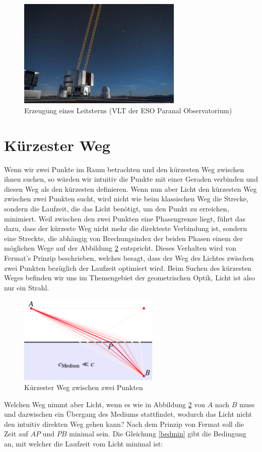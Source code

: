 \begin{refsection}
\begin{figure}
  \centering
  \includegraphics[width=0.7\textwidth]{adaptiv/images/Leitstern}
  \caption{Erzeugung eines Leitsterns (VLT der ESO Paranal Observatorium)
    \cite{eso:leitstern}}
  \label{fig:leitstern}
\end{figure}

\section{Kürzester Weg}
Wenn wir zwei Punkte im Raum betrachten und den kürzesten Weg zwischen ihnen suchen, so würden wir intuitiv die Punkte mit einer Geraden verbinden und diesen Weg als den kürzesten definieren. Wenn nun aber Licht den kürzesten Weg zwischen zwei Punkten sucht, wird nicht wie beim klassischen Weg die Strecke, sondern die Laufzeit, die das Licht benötigt, um den Punkt zu erreichen, minimiert. Weil zwischen den zwei Punkten eine Phasengrenze liegt, führt das dazu, dass der kürzeste Weg nicht mehr die direkteste Verbindung ist, sondern eine Streckte, die abhängig von Brechungsindex der beiden Phasen einem der möglichen Wege auf der Abbildung \ref{fig:weg} entspricht. Dieses Verhalten wird von Fermat's Prinzip beschrieben, welches besagt, dass der Weg des Lichtes zwischen zwei Punkten bezüglich der Laufzeit optimiert wird. Beim Suchen des kürzesten Weges befinden wir uns im Themengebiet der geometrischen Optik, Licht ist also nur ein Strahl. 

\begin{figure}
  \centering
  \includegraphics[width=0.6\textwidth]{adaptiv/images/Weg}
  \caption{Kürzester Weg zwischen zwei Punkten}
  \label{fig:weg}
\end{figure}
Welchen Weg nimmt aber Licht, wenn es wie in Abbildung \ref{fig:weg} von $A$ nach $B$ muss und dazwischen ein Übergang des Mediums stattfindet, wodurch das Licht nicht den intuitiv direkten Weg gehen kann? Nach dem Prinzip von Fermat soll die Zeit auf $\overline{AP}$ und $\overline{PB}$ minimal sein. Die Gleichung \eqref{bedmin} gibt die Bedingung an, mit welcher die Laufzeit vom Licht minimal ist:


\end{refsection}
